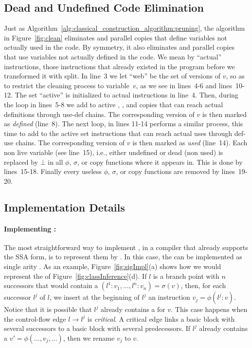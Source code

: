 \subsection{Dead and Undefined Code Elimination}

Just as Algorithm~\ref{alg:classical_construction_algorithm:pruning}, the algorithm in Figure~\ref{fig:clean} eliminates \phifuns and parallel copies that define variables not actually used in the code. By symmetry, it also eliminates \sigmafuns  and parallel copies  that use variables not actually defined in the code.
We mean by ``actual'' instructions, those instructions that already existed in the program before we transformed it with \textsf{split}.
In line~3 we let ``web'' be the set of versions of $v$, so as to restrict the cleaning process to variable~$v$, as we see in lines~4-6 and lines~10-12.
The set ``active'' is initialized to actual instructions in line~4.
Then, during the loop in lines~5-8 we add to active \phifuns, \sigmafuns, and copies that can reach actual definitions through use-def chains.
The corresponding version of $v$ is then marked as \emph{defined} (line~8).
The next loop, in lines 11-14 performs a similar process, this time to add to the active set instructions that can reach actual uses through def-use chains.
The corresponding version of $v$ is then marked as \emph{used} (line~14).
Each non live variable (see line~15), i.e., either undefined or dead (non used) is replaced by $\bot$ in all $\phi$, $\sigma$, or copy functions where it appears in.
This is done by lines~15-18.
Finally every useless $\phi$, $\sigma$, or copy functions are removed by lines~19-20. 

\subsection{Implementation Details}
\label{sub:special}

\paragraph{Implementing \sigmafuns: }
The most straightforward way to implement \sigmafuns, in a compiler that already supports the SSA form, is to represent them by \phifuns.
In this case, the \sigmafuns can be implemented as single arity \phifuns.
As an example, Figure~\ref{fig:sigImpl}(a) shows how we would represent the \sigmafuns of Figure~\ref{fig:classInference}(d). 
If $l$ is a branch point with $n$ successors that would contain a \sigmafun $(l^1:v_1, \ldots, l^n:v_n) =\sigma(v)$, then, for each successor $l^j$ of $l$, we insert at the beginning of $l^j$ an instruction $v_j = \phi(l^j:v)$.
Notice that it is possible that $l^j$ already contains a \phifun for $v$.
This case happens when the control-flow edge $l \rightarrow l^j$ is {\em critical}.
A critical edge links a basic block with several successors to a basic block with several predecessors.
If $l^j$ already contains a \phifun $v' = \phi(\ldots, v_j, \ldots)$, then we rename $v_j$ to $v$.

